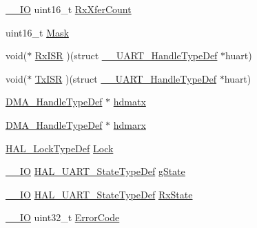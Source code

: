 \begin{DoxyCompactItemize}
\mbox{\hyperlink{core__sc300_8h_aec43007d9998a0a0e01faede4133d6be}{\+\_\+\+\_\+\+IO}} uint16\+\_\+t \mbox{\hyperlink{struct_____u_a_r_t___handle_type_def_a04c4b8902fadb460835b8856123453e1}{Rx\+Xfer\+Count}}
\item 
uint16\+\_\+t \mbox{\hyperlink{struct_____u_a_r_t___handle_type_def_a4378cb66c15ac382d50a6886d7e04241}{Mask}}
\item 
void($\ast$ \mbox{\hyperlink{struct_____u_a_r_t___handle_type_def_a7eb9527674b4a4315c0ad317bc2f4cd4}{Rx\+I\+SR}} )(struct \mbox{\hyperlink{struct_____u_a_r_t___handle_type_def}{\+\_\+\+\_\+\+U\+A\+R\+T\+\_\+\+Handle\+Type\+Def}} $\ast$huart)
\item 
void($\ast$ \mbox{\hyperlink{struct_____u_a_r_t___handle_type_def_a2ae0e5e556f6a1eb46aabf8d010b5722}{Tx\+I\+SR}} )(struct \mbox{\hyperlink{struct_____u_a_r_t___handle_type_def}{\+\_\+\+\_\+\+U\+A\+R\+T\+\_\+\+Handle\+Type\+Def}} $\ast$huart)
\item 
\mbox{\hyperlink{group___d_m_a___exported___types_ga41b754a906b86bce54dc79938970138b}{D\+M\+A\+\_\+\+Handle\+Type\+Def}} $\ast$ \mbox{\hyperlink{struct_____u_a_r_t___handle_type_def_afdedbb0ffa1d4bc145a01434d4794c92}{hdmatx}}
\item 
\mbox{\hyperlink{group___d_m_a___exported___types_ga41b754a906b86bce54dc79938970138b}{D\+M\+A\+\_\+\+Handle\+Type\+Def}} $\ast$ \mbox{\hyperlink{struct_____u_a_r_t___handle_type_def_aad7929af8d6acf108c85fe9c7b83c128}{hdmarx}}
\item 
\mbox{\hyperlink{stm32f7xx__hal__def_8h_ab367482e943333a1299294eadaad284b}{H\+A\+L\+\_\+\+Lock\+Type\+Def}} \mbox{\hyperlink{struct_____u_a_r_t___handle_type_def_a203cf57913d43137feeb4fe24fe38af2}{Lock}}
\item 
\mbox{\hyperlink{core__sc300_8h_aec43007d9998a0a0e01faede4133d6be}{\+\_\+\+\_\+\+IO}} \mbox{\hyperlink{group___u_a_r_t___exported___types_ga94c58ae1f4dbcf6032224edfc93a6e19}{H\+A\+L\+\_\+\+U\+A\+R\+T\+\_\+\+State\+Type\+Def}} \mbox{\hyperlink{struct_____u_a_r_t___handle_type_def_a0c4242c009d8754417dfd87a5ab6cb10}{g\+State}}
\item 
\mbox{\hyperlink{core__sc300_8h_aec43007d9998a0a0e01faede4133d6be}{\+\_\+\+\_\+\+IO}} \mbox{\hyperlink{group___u_a_r_t___exported___types_ga94c58ae1f4dbcf6032224edfc93a6e19}{H\+A\+L\+\_\+\+U\+A\+R\+T\+\_\+\+State\+Type\+Def}} \mbox{\hyperlink{struct_____u_a_r_t___handle_type_def_a1b5639a73b305432afeb6aa18506d0fb}{Rx\+State}}
\item 
\mbox{\hyperlink{core__sc300_8h_aec43007d9998a0a0e01faede4133d6be}{\+\_\+\+\_\+\+IO}} uint32\+\_\+t \mbox{\hyperlink{struct_____u_a_r_t___handle_type_def_a0447bf9458caff1ad44ee7e947b1413f}{Error\+Code}}
\end{DoxyCompactItemize}


